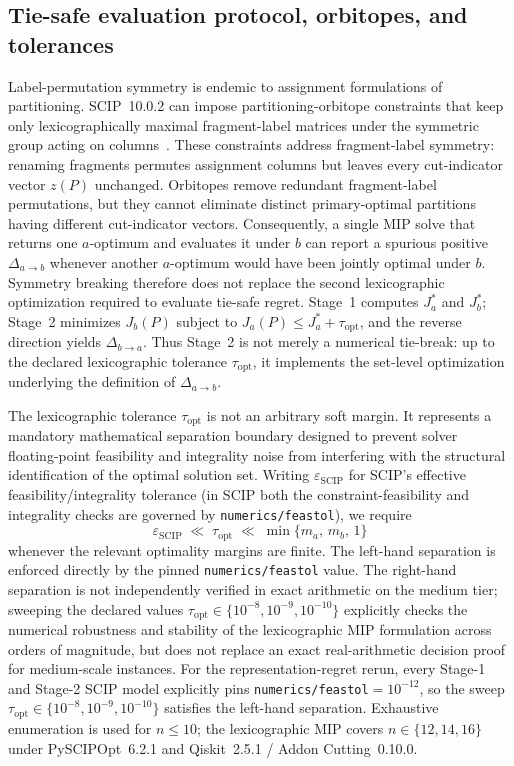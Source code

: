 \documentclass[
  aps,
  pra,
  reprint,
  amsmath,
  amssymb,
  longbibliography,
  nofootinbib,
  floatfix
]{revtex4-2}
\theoremstyle{plain}
\begin{document}
\subsection{Tie-safe evaluation protocol, orbitopes, and tolerances}
\label{sec:tie-safe-protocol}

Label-permutation symmetry is endemic to assignment formulations of partitioning. SCIP~10.0.2 can impose partitioning-orbitope constraints that keep only lexicographically maximal fragment-label matrices under the symmetric group acting on columns~\cite{kaibel2008}. These constraints address fragment-label symmetry: renaming fragments permutes assignment columns but leaves every cut-indicator vector $z(P)$ unchanged. Orbitopes remove redundant fragment-label permutations, but they cannot eliminate distinct primary-optimal partitions having different cut-indicator vectors. Consequently, a single MIP solve that returns one $a$-optimum and evaluates it under $b$ can report a spurious positive $\Delta_{a\to b}$ whenever another $a$-optimum would have been jointly optimal under $b$. Symmetry breaking therefore does not replace the second lexicographic optimization required to evaluate tie-safe regret. Stage~1 computes $J_a^*$ and $J_b^*$; Stage~2 minimizes $J_b(P)$ subject to $J_a(P)\le J_a^*+\tau_{\mathrm{opt}}$, and the reverse direction yields $\Delta_{b\to a}$. Thus Stage~2 is not merely a numerical tie-break: up to the declared lexicographic tolerance $\tau_{\mathrm{opt}}$, it implements the set-level optimization underlying the definition of $\Delta_{a\to b}$.

The lexicographic tolerance $\tau_{\mathrm{opt}}$ is not an arbitrary soft margin. It represents a mandatory mathematical separation boundary designed to prevent solver floating-point feasibility and integrality noise from interfering with the structural identification of the optimal solution set. Writing $\varepsilon_{\mathrm{SCIP}}$ for SCIP's effective feasibility/integrality tolerance (in SCIP both the constraint-feasibility and integrality checks are governed by \texttt{numerics/feastol}), we require
\begin{equation}
  \varepsilon_{\mathrm{SCIP}}
  \;\ll\;
  \tau_{\mathrm{opt}}
  \;\ll\;
  \min\bigl\{m_a,\,m_b,\,1\bigr\}
  \label{eq:tau-hierarchy}
\end{equation}
whenever the relevant optimality margins are finite. The left-hand separation is enforced directly by the pinned \texttt{numerics/feastol} value. The right-hand separation is not independently verified in exact arithmetic on the medium tier; sweeping the declared values $\tau_{\mathrm{opt}}\in\{10^{-8},10^{-9},10^{-10}\}$ explicitly checks the numerical robustness and stability of the lexicographic MIP formulation across orders of magnitude, but does not replace an exact real-arithmetic decision proof for medium-scale instances. For the representation-regret rerun, every Stage-1 and Stage-2 SCIP model explicitly pins \texttt{numerics/feastol}$=10^{-12}$, so the sweep $\tau_{\mathrm{opt}}\in\{10^{-8},10^{-9},10^{-10}\}$ satisfies the left-hand separation. Exhaustive enumeration is used for $n\le10$; the lexicographic MIP covers $n\in\{12,14,16\}$ under PySCIPOpt~6.2.1 and Qiskit~2.5.1 / Addon Cutting~0.10.0.
\end{document}
